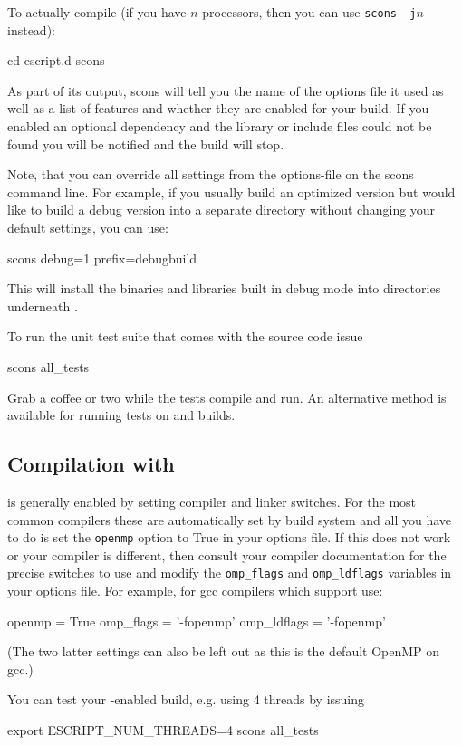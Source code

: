 To actually compile (if you have $n$ processors, then you can use \texttt{scons -j$n$} instead):

\begin{shellCode}
cd escript.d
scons
\end{shellCode}

As part of its output, scons will tell you the name of the options file it used
as well as a list of features and whether they are enabled for your build.
If you enabled an optional dependency and the library or include files could
not be found you will be notified and the build will stop.

Note, that you can override all settings from the options-file on the scons
command line. For example, if you usually build an optimized version but would
like to build a debug version into a separate directory without changing your
default settings, you can use:
\begin{shellCode}
scons debug=1 prefix=debugbuild
\end{shellCode}
This will install the binaries and libraries built in debug mode into
directories underneath .

To run the unit test suite that comes with the source code issue
\begin{shellCode}
scons all_tests
\end{shellCode}
Grab a coffee or two while the tests compile and run.
An alternative method is available for running tests on \openmp and \mpi builds.

\subsection{Compilation with \openmp}
\openmp is generally enabled by setting compiler and linker switches. For the
most common compilers these are automatically set by build system and all you
have to do is set the \texttt{openmp} option to True in your options file. If
this does not work or your compiler is different, then consult your compiler
documentation for the precise switches to use and modify the \texttt{omp_flags}
and \texttt{omp_ldflags} variables in your options file.
For example, for gcc compilers which support \openmp use:
\begin{shellCode}
openmp = True
omp_flags = '-fopenmp'
omp_ldflags = '-fopenmp'
\end{shellCode}
(The two latter settings can also be left out as this is the default OpenMP on gcc.)

You can test your \openmp-enabled build, e.g. using 4 threads by issuing
\begin{shellCode}
export ESCRIPT_NUM_THREADS=4
scons all_tests
\end{shellCode}


